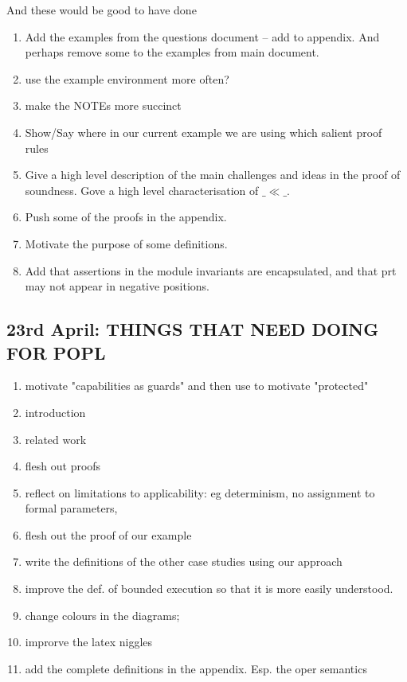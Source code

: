 \documentclass[acmsmall,review,anonymous]{acmart}\settopmatter{printfolios=true}
\begin{document}
And these would be good to have done

\begin{enumerate}
\item
Add the examples from the questions document -- add to appendix. And perhaps remove some to the examples from main document.

\item
use the example environment more often?

\item
make the NOTEs more succinct

\item
Show/Say where in our current example we are using which salient proof rules

\item
Give a high level description of the main challenges and ideas in the proof of soundness. Gove a high level characterisation of $\_\ll\_$.

\item
Push some of the proofs in the appendix.

\item
Motivate the purpose of some definitions.

\item
Add that assertions in the module invariants are encapsulated, and that prt may not appear in negative positions.

\end{enumerate}


\subsection*{23rd April: THINGS THAT NEED DOING FOR POPL}

\begin{enumerate}
\item
motivate "capabilities as guards" and then use to motivate "protected"
\item
introduction
\item
related work
\item
flesh out proofs
\item
reflect on limitations to applicability: eg determinism, no assignment to formal parameters, 
\item
flesh out the proof of our example
\item
write the definitions of the other case studies using our approach
\item
improve the def. of bounded execution so that it is more easily understood.
\item
change colours in the diagrams; 
\item
improrve the latex niggles 
\item
add the complete definitions in the appendix. Esp. the oper semantics
\end{enumerate}

 
\end{document}
